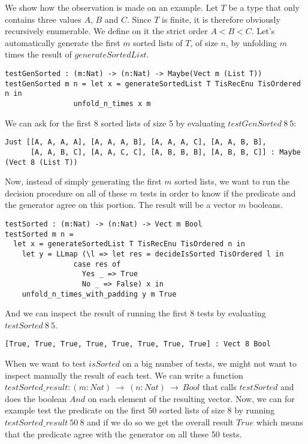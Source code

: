 We show how the observation is made on an example. Let $T$ be a type that only contains three values $A$, $B$ and $C$. Since $T$ is finite, it is therefore obviously recursively enumerable. We define on it the strict order $A < B < C$.
Let's automatically generate the first $m$ sorted lists of $T$, of size $n$, by unfolding $m$ times the result of $generateSortedList$.


\begin{lstlisting}
testGenSorted : (m:Nat) -> (n:Nat) -> Maybe(Vect m (List T))
testGenSorted m n = let x = generateSortedList T TisRecEnu TisOrdered n in
		      	unfold_n_times x m
\end{lstlisting}
We can ask for the first 8 sorted lists of size 5 by evaluating $testGenSorted\ 8\ 5$:

\begin{lstlisting}
Just [[A, A, A, A], [A, A, A, B], [A, A, A, C], [A, A, B, B],
      [A, A, B, C], [A, A, C, C], [A, B, B, B], [A, B, B, C]] : Maybe (Vect 8 (List T))
\end{lstlisting}
Now, instead of simply generating the first $m$ sorted lists, we want to run the decision procedure on all of these $m$ tests in order to know if the predicate and the generator agree on this portion. The result will be a vector $m$ booleans.

\begin{lstlisting}
testSorted : (m:Nat) -> (n:Nat) -> Vect m Bool
testSorted m n = 
  let x = generateSortedList T TisRecEnu TisOrdered n in
    let y = LLmap (\l => let res = decideIsSorted TisOrdered l in
			    case res of
			      Yes _ => True
			      No _ => False) x in
	unfold_n_times_with_padding y m True
\end{lstlisting}
And we can inspect the result of running the first 8 tests by evaluating $testSorted\ 8\ 5$.

\begin{lstlisting}
[True, True, True, True, True, True, True, True] : Vect 8 Bool
\end{lstlisting}
When we want to test $isSorted$ on a big number of tests, we might not want to inspect manually the result of each test. We can write a function $testSorted\_result : (m:Nat)\ \rightarrow\ (n:Nat)\ \rightarrow\ Bool$ that calls $testSorted$ and does the boolean $And$ on each element of the resulting vector. Now, we can for example test the predicate on the first 50 sorted lists of size 8 by running $testSorted\_result\ 50\ 8$ and if we do so we get the overall result $True$ which means that the predicate agree with the generator on all these 50 tests.


